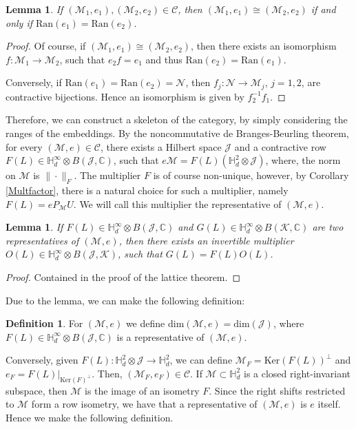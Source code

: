 \documentclass[11pt]{article}
\def\C{\mathbb{C}}
\def\bH{\mathbb{H}}
\newcommand{\J}{\ensuremath{\mathcal{J} }}
\newcommand{\K}{\ensuremath{\mathcal{K} }}
\renewcommand{\dim}[1]{\ensuremath{\mathrm{dim} \left( {#1} \right) }}
\newcommand{\ran}[1]{\ensuremath{\mathrm{Ran} \left( {#1} \right) }}
\renewcommand{\ker}[1]{\ensuremath{\mathrm{Ker} \left( {#1} \right) }}
\newcommand{\cC}{\ensuremath{\mathcal{C}}}
\newcommand{\sM}{\ensuremath{\mathscr{M}}}
\newcommand{\sN}{\ensuremath{\mathscr{N}}}
\numberwithin{equation}{section}
\numberwithin{subsection}{section}
\newtheorem{lemma}[subsection]{Lemma}
\theoremstyle{definition}
\newtheorem{defn}[subsection]{Definition}
\begin{document}
\begin{lemma}
If $(\sM_1,e_1), (\sM_2,e_2) \in \cC$, then $(\sM_1,e_1) \cong (\sM_2,e_2)$ if and only if $\ran{e_1} = \ran{e_2}$.
\end{lemma}
\begin{proof}
Of course, if $(\sM_1,e_1) \cong (\sM_2,e_2)$, then there exists an isomorphism $f \colon \sM_1 \to \sM_2$, such that $e_2 f = e_1$ and thus $\ran{e_2} = \ran{e_1}$.

Conversely, if $\ran{e_1} = \ran{e_2} = \sN$, then $f_j \colon \sN \to \sM_j$, $j = 1,2$, are contractive bijections. Hence an isomorphism is given by $f_2^{-1} f_1$.
\end{proof}

Therefore, we can construct a skeleton of the category, by simply considering the ranges of the embeddings. By the noncommutative de Branges-Beurling theorem, for every $(\sM,e) \in \cC$, there exists a Hilbert space $\J$ and a contractive row $F(L) \in \bH^{\infty}_d \otimes B(\J,\C)$, such that $e\sM = F(L)( \bH^2_d \otimes \J)$, where, the norm on $\sM$ is $\|\cdot\|_F$. The multiplier $F$ is of course non-unique, however, by Corollary \ref{Multfactor}, there is a natural choice for such a multiplier, namely $F(L) = e P_{\sM} U$. We will call this multiplier the representative of $(\sM,e)$.

\begin{lemma} \label{lem:equiv_reps}
If $F(L) \in \bH^{\infty}_d \otimes B(\J,\C)$ and $G(L) \in \bH^{\infty}_d \otimes B(\K,\C)$ are two representatives of $(\sM,e)$, then there exists an invertible multiplier $O(L) \in \bH^{\infty}_d \otimes B(\J,\K)$, such that $G(L) = F(L) O(L)$.
\end{lemma}
\begin{proof}
Contained in the proof of the lattice theorem.
\end{proof}

Due to the lemma, we can make the following definition:

\begin{defn}
For $(\sM,e)$ we define $\dim{\sM,e} = \dim{\J}$, where $F(L) \in \bH^{\infty}_d \otimes B(\J,\C)$ is a representative of $(\sM,e)$.
\end{defn}

Conversely, given $F(L) \colon \bH ^2_d \otimes \J \to \bH ^2_d$, we can define $\sM_F = \ker{F(L)}^{\perp}$ and $e_F = F(L)|_{\ker{F}^{\perp}}$. Then, $(\sM_F,e_F) \in \cC$. If $\sM \subset \bH ^2_d$ is a closed right-invariant subspace, then $\sM$ is the image of an isometry $F$. Since the right shifts restricted to $\sM$ form a row isometry, we have that a representative of $(\sM,e)$ is $e$ itself. Hence we make the following definition.
\end{document}
